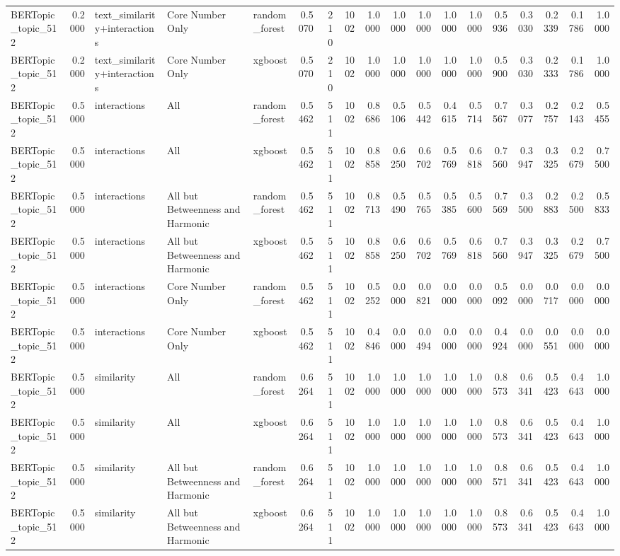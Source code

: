 \begin{tabular}{lrlllrrrrrrrrrrrrr}
BERTopic_topic_512 & 0.2000 & text_similarity+interactions & Core Number Only & random_forest & 0.5070 & 210 & 1002 & 1.0000 & 1.0000 & 1.0000 & 1.0000 & 1.0000 & 0.5936 & 0.3030 & 0.2339 & 0.1786 & 1.0000 \\
BERTopic_topic_512 & 0.2000 & text_similarity+interactions & Core Number Only & xgboost & 0.5070 & 210 & 1002 & 1.0000 & 1.0000 & 1.0000 & 1.0000 & 1.0000 & 0.5900 & 0.3030 & 0.2333 & 0.1786 & 1.0000 \\
BERTopic_topic_512 & 0.5000 & interactions & All & random_forest & 0.5462 & 511 & 1002 & 0.8686 & 0.5106 & 0.5442 & 0.4615 & 0.5714 & 0.7567 & 0.3077 & 0.2757 & 0.2143 & 0.5455 \\
BERTopic_topic_512 & 0.5000 & interactions & All & xgboost & 0.5462 & 511 & 1002 & 0.8858 & 0.6250 & 0.6702 & 0.5769 & 0.6818 & 0.7560 & 0.3947 & 0.3325 & 0.2679 & 0.7500 \\
BERTopic_topic_512 & 0.5000 & interactions & All but Betweenness and Harmonic & random_forest & 0.5462 & 511 & 1002 & 0.8713 & 0.5490 & 0.5765 & 0.5385 & 0.5600 & 0.7569 & 0.3500 & 0.2883 & 0.2500 & 0.5833 \\
BERTopic_topic_512 & 0.5000 & interactions & All but Betweenness and Harmonic & xgboost & 0.5462 & 511 & 1002 & 0.8858 & 0.6250 & 0.6702 & 0.5769 & 0.6818 & 0.7560 & 0.3947 & 0.3325 & 0.2679 & 0.7500 \\
BERTopic_topic_512 & 0.5000 & interactions & Core Number Only & random_forest & 0.5462 & 511 & 1002 & 0.5252 & 0.0000 & 0.0821 & 0.0000 & 0.0000 & 0.5092 & 0.0000 & 0.0717 & 0.0000 & 0.0000 \\
BERTopic_topic_512 & 0.5000 & interactions & Core Number Only & xgboost & 0.5462 & 511 & 1002 & 0.4846 & 0.0000 & 0.0494 & 0.0000 & 0.0000 & 0.4924 & 0.0000 & 0.0551 & 0.0000 & 0.0000 \\
BERTopic_topic_512 & 0.5000 & similarity & All & random_forest & 0.6264 & 511 & 1002 & 1.0000 & 1.0000 & 1.0000 & 1.0000 & 1.0000 & 0.8573 & 0.6341 & 0.5423 & 0.4643 & 1.0000 \\
BERTopic_topic_512 & 0.5000 & similarity & All & xgboost & 0.6264 & 511 & 1002 & 1.0000 & 1.0000 & 1.0000 & 1.0000 & 1.0000 & 0.8573 & 0.6341 & 0.5423 & 0.4643 & 1.0000 \\
BERTopic_topic_512 & 0.5000 & similarity & All but Betweenness and Harmonic & random_forest & 0.6264 & 511 & 1002 & 1.0000 & 1.0000 & 1.0000 & 1.0000 & 1.0000 & 0.8571 & 0.6341 & 0.5423 & 0.4643 & 1.0000 \\
BERTopic_topic_512 & 0.5000 & similarity & All but Betweenness and Harmonic & xgboost & 0.6264 & 511 & 1002 & 1.0000 & 1.0000 & 1.0000 & 1.0000 & 1.0000 & 0.8573 & 0.6341 & 0.5423 & 0.4643 & 1.0000 \\

\end{tabular}
